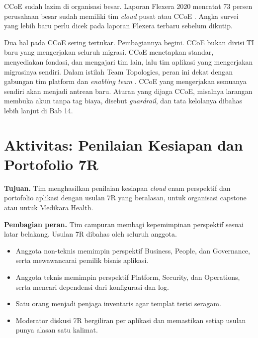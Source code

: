 CCoE sudah lazim di organisasi besar. Laporan Flexera 2020 mencatat 73 persen perusahaan
besar sudah memiliki tim \textit{cloud} pusat atau CCoE \cite{c04-flexera2020}. Angka
survei yang lebih baru perlu dicek pada laporan Flexera terbaru sebelum dikutip.

Dua hal pada CCoE sering tertukar. Pembagiannya begini. CCoE bukan divisi TI baru yang
mengerjakan seluruh migrasi. CCoE menetapkan standar, menyediakan fondasi, dan mengajari
tim lain, lalu tim aplikasi yang mengerjakan migrasinya sendiri. Dalam istilah Team
Topologies, peran ini dekat dengan gabungan tim platform dan \textit{enabling team}
\cite{skelton2025}. CCoE yang mengerjakan semuanya sendiri akan menjadi antrean baru.
Aturan yang dijaga CCoE, misalnya larangan membuka akun tanpa tag biaya, disebut
\textit{guardrail}, dan tata kelolanya dibahas lebih lanjut di Bab 14.

\section{Aktivitas: Penilaian Kesiapan dan Portofolio 7R}
\label{sec:ch04-aktivitas}

\textbf{Tujuan.} Tim menghasilkan penilaian kesiapan \textit{cloud} enam perspektif dan
portofolio aplikasi dengan usulan 7R yang beralasan, untuk organisasi capstone atau untuk
Medikara Health.

\textbf{Pembagian peran.} Tim campuran membagi kepemimpinan perspektif sesuai latar
belakang. Usulan 7R dibahas oleh seluruh anggota.
\begin{itemize}
  \item Anggota non-teknis memimpin perspektif Business, People, dan Governance, serta
        mewawancarai pemilik bisnis aplikasi.
  \item Anggota teknis memimpin perspektif Platform, Security, dan Operations, serta
        mencari dependensi dari konfigurasi dan log.
  \item Satu orang menjadi penjaga inventaris agar templat terisi seragam.
  \item Moderator diskusi 7R bergiliran per aplikasi dan memastikan setiap usulan punya
        alasan satu kalimat.
\end{itemize}

